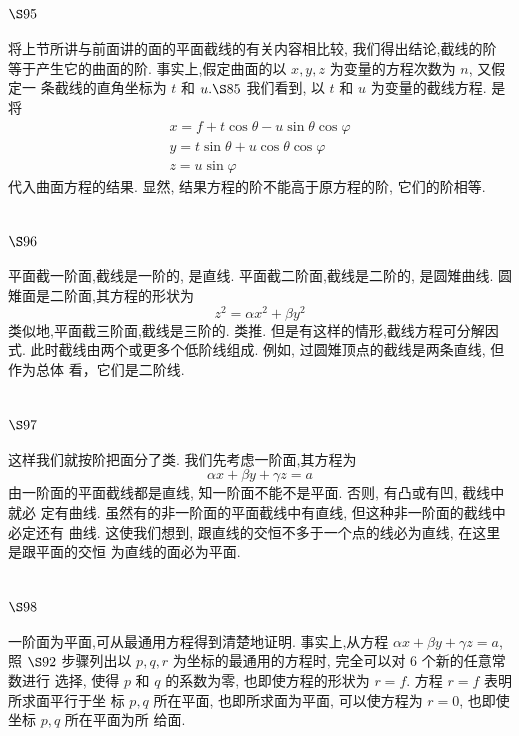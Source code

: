 \section{$\S 95$}

将上节所讲与前面讲的面的平面截线的有关内容相比较, 我们得出结论,截线的阶 等于产生它的曲面的阶. 事实上,假定曲面的以 $x, y, z$ 为变量的方程次数为 $n$, 又假定一 条截线的直角坐标为 $t$ 和 $u . \S 85$ 我们看到, 以 $t$ 和 $u$ 为变量的截线方程. 是将
\[
\begin{gathered}
x=f+t \cos \theta-u \sin \theta \cos \varphi \\
y=t \sin \theta+u \cos \theta \cos \varphi \\
z=u \sin \varphi
\end{gathered}
\]
代入曲面方程的结果. 显然, 结果方程的阶不能高于原方程的阶, 它们的阶相等.

\section{$\S 96$}

平面截一阶面,截线是一阶的, 是直线. 平面截二阶面,截线是二阶的, 是圆雉曲线. 圆雉面是二阶面,其方程的形状为
\[
z^{2}=\alpha x^{2}+\beta y^{2}
\]
类似地,平面截三阶面,截线是三阶的. 类推. 但是有这样的情形,截线方程可分解因式. 此时截线由两个或更多个低阶线组成. 例如, 过圆雉顶点的截线是两条直线, 但作为总体 看，它们是二阶线.

\section{$\S 97$}

这样我们就按阶把面分了类. 我们先考虑一阶面,其方程为
\[
\alpha x+\beta y+\gamma z=a
\]
由一阶面的平面截线都是直线, 知一阶面不能不是平面. 否则, 有凸或有凹, 截线中就必 定有曲线. 虽然有的非一阶面的平面截线中有直线, 但这种非一阶面的截线中必定还有 曲线. 这使我们想到, 跟直线的交恒不多于一个点的线必为直线, 在这里是跟平面的交恒 为直线的面必为平面.

\section{$\S 98$}

一阶面为平面,可从最通用方程得到清楚地证明. 事实上,从方程 $\alpha x+\beta y+\gamma z=a$, 照 $\S 92$ 步骤列出以 $p, q, r$ 为坐标的最通用的方程时, 完全可以对 6 个新的任意常数进行 选择, 使得 $p$ 和 $q$ 的系数为零, 也即使方程的形状为 $r=f$. 方程 $r=f$ 表明所求面平行于坐 标 $p, q$ 所在平面, 也即所求面为平面, 可以使方程为 $r=0$, 也即使坐标 $p, q$ 所在平面为所 给面.

